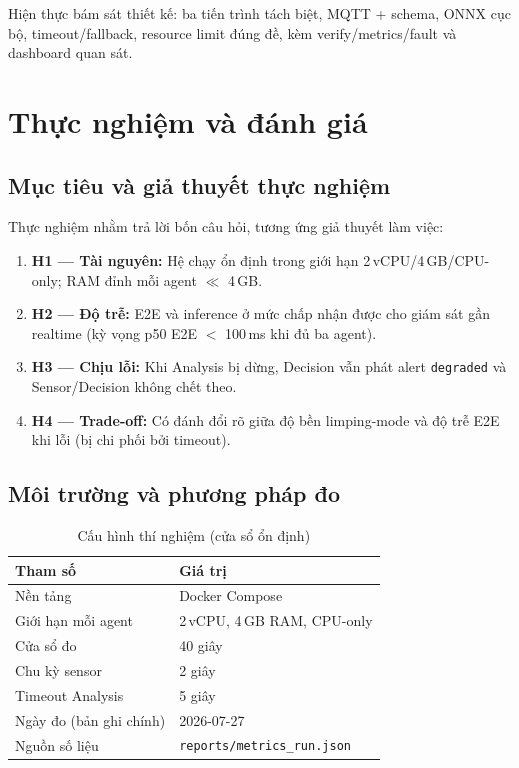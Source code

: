 \documentclass[12pt,a4paper,oneside]{report}
\newcommand{\code}[1]{\texttt{#1}}
\begin{document}
Hiện thực bám sát thiết kế: ba tiến trình tách biệt, MQTT + schema, ONNX cục bộ, timeout/fallback, resource limit đúng đề, kèm verify/metrics/fault và dashboard quan sát.

\chapter{Thực nghiệm và đánh giá}

\section{Mục tiêu và giả thuyết thực nghiệm}

Thực nghiệm nhằm trả lời bốn câu hỏi, tương ứng giả thuyết làm việc:
\begin{enumerate}
  \item \textbf{H1 --- Tài nguyên:} Hệ chạy ổn định trong giới hạn 2\,vCPU/4\,GB/CPU-only; RAM đỉnh mỗi agent $\ll$ 4\,GB.
  \item \textbf{H2 --- Độ trễ:} E2E và inference ở mức chấp nhận được cho giám sát gần realtime (kỳ vọng p50 E2E $<$ 100\,ms khi đủ ba agent).
  \item \textbf{H3 --- Chịu lỗi:} Khi Analysis bị dừng, Decision vẫn phát alert \code{degraded} và Sensor/Decision không chết theo.
  \item \textbf{H4 --- Trade-off:} Có đánh đổi rõ giữa độ bền limping-mode và độ trễ E2E khi lỗi (bị chi phối bởi timeout).
\end{enumerate}

\section{Môi trường và phương pháp đo}

\begin{table}[htbp]
  \centering
  \caption{Cấu hình thí nghiệm (cửa sổ ổn định)}
  \label{tab:cau-hinh-do}
  \begin{tabular}{ll}
    \toprule
    \textbf{Tham số} & \textbf{Giá trị} \\
    \midrule
    Nền tảng & Docker Compose \\
    Giới hạn mỗi agent & 2\,vCPU, 4\,GB RAM, CPU-only \\
    Cửa sổ đo & 40 giây \\
    Chu kỳ sensor & 2 giây \\
    Timeout Analysis & 5 giây \\
    Ngày đo (bản ghi chính) & 2026-07-27 \\
    Nguồn số liệu & \code{reports/metrics\_run.json} \\
    \bottomrule
  \end{tabular}
\end{table}
\end{document}
